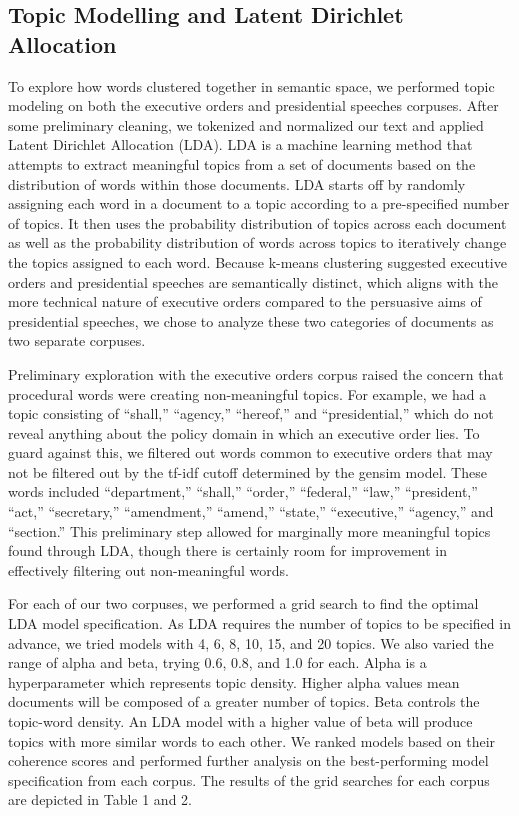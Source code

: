 \documentclass{article}
\begin{document}
{\subsection{Topic Modelling and Latent Dirichlet Allocation}{To explore how words clustered together in semantic space, we performed topic modeling on both the executive orders and presidential speeches corpuses. After some preliminary cleaning, we tokenized and normalized our text and applied Latent Dirichlet Allocation (LDA). LDA is a machine learning method that attempts to extract meaningful topics from a set of documents based on the distribution of words within those documents. LDA starts off by randomly assigning each word in a document to a topic according to a pre-specified number of topics. It then uses the probability distribution of topics across each document as well as the probability distribution of words across topics to iteratively change the topics assigned to each word. 
Because k-means clustering suggested executive orders and presidential speeches are semantically distinct, which aligns with the more technical nature of executive orders compared to the persuasive aims of presidential speeches, we chose to analyze these two categories of documents as two separate corpuses. 

Preliminary exploration with the executive orders corpus raised the concern that procedural words were creating non-meaningful topics. For example, we had a topic consisting of “shall,” “agency,” “hereof,” and “presidential,” which do not reveal anything about the policy domain in which an executive order lies. To guard against this, we filtered out words common to executive orders that may not be filtered out by the tf-idf cutoff determined by the gensim model. These words included “department,” “shall,” “order,” “federal,” “law,” “president,” “act,” “secretary,” “amendment,” “amend,” “state,” “executive,” “agency,” and “section.” This preliminary step allowed for marginally more meaningful topics found through LDA, though there is certainly room for improvement in effectively filtering out non-meaningful words.
 
For each of our two corpuses, we performed a grid search to find the optimal LDA model specification. As LDA requires the number of topics to be specified in advance, we tried models with 4, 6, 8, 10, 15, and 20 topics. We also varied the range of alpha and beta, trying 0.6, 0.8, and 1.0 for each. Alpha is a hyperparameter which represents topic density. Higher alpha values mean documents will be composed of a greater number of topics. Beta controls the topic-word density. An LDA model with a higher value of beta will produce topics with more similar words to each other. We ranked models based on their coherence scores and performed further analysis on the best-performing model specification from each corpus. The results of the grid searches for each corpus are depicted in Table 1 and 2. 
	
}}
\end{document}
